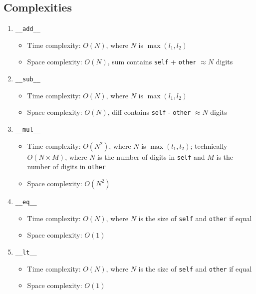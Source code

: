 \documentclass[a4paper]{article}
\begin{document}
\subsection{Complexities}
\begin{enumerate}
    \item \texttt{\_\_add\_\_}
        \begin{itemize}
            \item Time complexity: \( O(N) \), where \( N \) is \( \max(l_1, l_2) \)
            \item Space complexity: \( O(N) \), sum contains \texttt{self} + \texttt{other} \( \approx N \) digits
        \end{itemize}

    \item \texttt{\_\_sub\_\_}
        \begin{itemize}
            \item Time complexity: \( O(N) \), where \( N \) is \( \max(l_1, l_2) \)
            \item Space complexity: \( O(N) \), diff contains \texttt{self} - \texttt{other} \( \approx N \) digits
        \end{itemize}

    \item \texttt{\_\_mul\_\_}
        \begin{itemize}
            \item Time complexity: \( O(N^2) \), where \( N \) is \( \max(l_1, l_2) \); technically \( O(N \times M) \), where \( N \) is the number of digits in \texttt{self} and \( M \) is the number of digits in \texttt{other}
            \item Space complexity: \( O(N^2) \)
        \end{itemize}

    \item \texttt{\_\_eq\_\_}
        \begin{itemize}
            \item Time complexity: \( O(N) \), where \( N \) is the size of \texttt{self} and \texttt{other} if equal
            \item Space complexity: \( O(1) \)
        \end{itemize}

    \item \texttt{\_\_lt\_\_}
        \begin{itemize}
            \item Time complexity: \( O(N) \), where \( N \) is the size of \texttt{self} and \texttt{other} if equal
            \item Space complexity: \( O(1) \)
        \end{itemize}


\end{enumerate}
\end{document}
